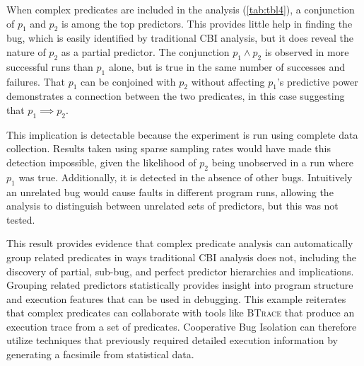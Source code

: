 When complex predicates are included in the analysis (\autoref{tab:tbl4}), a conjunction of $p_1$ and $p_2$ is among the top predictors.  This provides little help in finding the bug, which is easily identified by traditional CBI analysis, but it does reveal the nature of $p_2$ as a partial predictor.  The conjunction $p_1 \wedge p_2$ is observed in more successful runs than $p_1$ alone, but is true in the same number of successes and failures.  That $p_1$ can be conjoined with $p_2$ without affecting $p_1$'s predictive power demonstrates a connection between the two predicates, in this case suggesting that $p_1 \implies p_2$.

This implication is detectable because the experiment is run using complete data collection.  Results taken using sparse sampling rates would have made this detection impossible, given the likelihood of $p_2$ being unobserved in a run where $p_1$ was true.  Additionally, it is detected in the absence of other bugs.  Intuitively an unrelated bug would cause faults in different program runs, allowing the analysis to distinguish between unrelated sets of predictors, but this was not tested.

This result provides evidence that complex predicate analysis can automatically group related predicates in ways traditional CBI analysis does not, including the discovery of partial, sub-bug, and perfect predictor hierarchies and implications.  Grouping related predictors statistically provides insight into program structure and execution features that can be used in debugging.  This example reiterates that complex predicates can collaborate with tools like \textsc{BTrace} that produce an execution trace from a set of predicates.  Cooperative Bug Isolation can therefore utilize techniques that previously required detailed execution information by generating a facsimile from statistical data.


